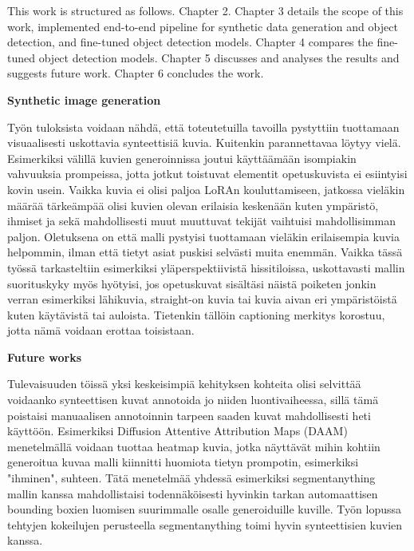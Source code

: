This work is structured as follows. Chapter 2. Chapter 3 details the scope of this work, implemented end-to-end pipeline for synthetic data generation and object detection, and fine-tuned object detection models. Chapter 4 compares the fine-tuned object detection models. Chapter 5 discusses and analyses the results and suggests future work. Chapter 6 concludes the work.

\textbf{Synthetic image generation}

Työn tuloksista voidaan nähdä, että toteutetuilla tavoilla pystyttiin tuottamaan visuaalisesti uskottavia synteettisiä kuvia. Kuitenkin parannettavaa löytyy vielä. Esimerkiksi välillä kuvien generoinnissa joutui käyttäämään isompiakin vahvuuksia prompeissa, jotta jotkut toistuvat elementit opetuskuvista ei esiintyisi kovin usein. Vaikka kuvia ei olisi paljoa LoRAn kouluttamiseen, jatkossa vieläkin määrää tärkeämpää olisi kuvien olevan erilaisia keskenään kuten ympäristö, ihmiset ja sekä mahdollisesti muut muuttuvat tekijät vaihtuisi mahdollisimman paljon. Oletuksena on että malli pystyisi tuottamaan vieläkin erilaisempia kuvia helpommin, ilman että tietyt asiat puskisi selvästi muita enemmän. Vaikka tässä työssä tarkasteltiin esimerkiksi yläperspektiivistä hissitiloissa, uskottavasti mallin suorituskyky myös hyötyisi, jos opetuskuvat sisältäsi näistä poiketen jonkin verran esimerkiksi lähikuvia, straight-on kuvia tai kuvia aivan eri ympäristöistä kuten käytävistä tai auloista. Tietenkin tällöin captioning merkitys korostuu, jotta nämä voidaan erottaa toisistaan.

\textbf{Future works}


Tulevaisuuden töissä yksi keskeisimpiä kehityksen kohteita olisi selvittää voidaanko synteettisen kuvat annotoida jo niiden luontivaiheessa, sillä tämä poistaisi manuaalisen annotoinnin tarpeen saaden kuvat mahdollisesti heti käyttöön. Esimerkiksi Diffusion Attentive Attribution Maps (DAAM) \cite{https://arxiv.org/pdf/2210.04885} menetelmällä voidaan tuottaa heatmap kuvia, jotka näyttävät mihin kohtiin generoitua kuvaa malli kiinnitti huomiota tietyn prompotin, esimerkiksi "ihminen", suhteen. Tätä menetelmää yhdessä esimerkiksi segmentanything \cite{https://arxiv.org/pdf/2304.02643, https://huggingface.co/spaces/Xenova/segment-anything-web} mallin kanssa mahdollistaisi todennäköisesti hyvinkin tarkan automaattisen bounding boxien luomisen suurimmalle osalle generoiduille kuville. Työn lopussa tehtyjen kokeilujen perusteella segmentanything toimi hyvin synteettisien kuvien kanssa.

